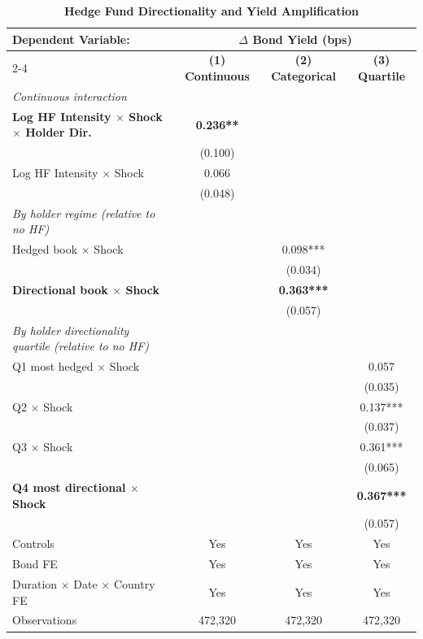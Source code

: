 \documentclass[english, 11pt, oneside]{article}
\begin{document}
\begin{table}[t]
\centering
\caption{\textbf{Hedge Fund Directionality and Yield Amplification}}
\footnotesize
\setlength{\tabcolsep}{10pt}
\renewcommand{\arraystretch}{1.1}
\begin{tabular}{l c c c}
\toprule
\textbf{Dependent Variable:} & \multicolumn{3}{c}{\textbf{$\Delta$ Bond Yield (bps)}} \\
\cmidrule(lr){2-4}
 & \textbf{(1) Continuous} & \textbf{(2) Categorical} & \textbf{(3) Quartile} \\
\midrule
\textit{Continuous interaction} & & & \\
\textbf{Log HF Intensity $\times$ Shock $\times$ Holder Dir.} & \textbf{0.236**} & & \\
 & (0.100) & & \\
Log HF Intensity $\times$ Shock & 0.066 & & \\
 & (0.048) & & \\
\addlinespace
\textit{By holder regime (relative to no HF)} & & & \\
Hedged book $\times$ Shock & & 0.098*** & \\
 & & (0.034) & \\
\textbf{Directional book $\times$ Shock} & & \textbf{0.363***} & \\
 & & (0.057) & \\
\addlinespace
\textit{By holder directionality quartile (relative to no HF)} & & & \\
Q1 most hedged $\times$ Shock & & & 0.057 \\
 & & & (0.035) \\
Q2 $\times$ Shock & & & 0.137*** \\
 & & & (0.037) \\
Q3 $\times$ Shock & & & 0.361*** \\
 & & & (0.065) \\
\textbf{Q4 most directional $\times$ Shock} & & & \textbf{0.367***} \\
 & & & (0.057) \\
\midrule
Controls & Yes & Yes & Yes \\
Bond FE & Yes & Yes & Yes \\
Duration $\times$ Date $\times$ Country FE & Yes & Yes & Yes \\
\midrule
Observations & 472,320 & 472,320 & 472,320 \\
\bottomrule
\end{tabular}
\label{tab:directionality}


\end{table}
\end{document}
